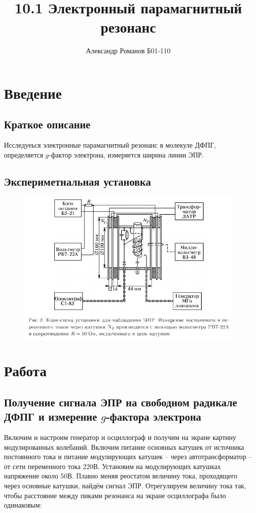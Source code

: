 \documentclass{article}
\author{Александр Романов Б01-110}
\date{}
\title{10.1 Электронный парамагнитный резонанс}
\begin{document}
\maketitle
\section{Введение}
\subsection{Краткое описание}
Исследуеься электронные парамагнитный резонанс в молекуле ДФПГ, определяется \(g\)-фактор электрона,
измеряется ширина линии ЭПР.

\subsection{Экспериметнальная установка}
\begin{figure}[H]
	\includegraphics[width=\textwidth]{scheme.png}
\end{figure}
\section{Работа}
\subsection{Получение сигнала ЭПР на свободном радикале ДФПГ и измерение \(g\)-фактора электрона}
Включим и настроим генератор и осциллограф и получим на экране картину модулированных колебаний. 
Включим питание основных катушек от источника постоянного тока и питание модулирующих катушек 
-- через автотрансформатор -- от сети переменного тока 220В. 
Установим на модулирующих катушках напряжение около 50В. Плавно меняя реостатом величину тока,
проходящего через основные катушки, найдём сигнал ЭПР. Отрегулируем величину тока так, чтобы 
расстояние между пиками резонанса на экране осциллографа было одинаковым:
\end{document}
